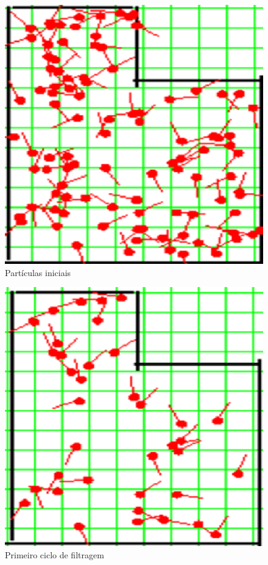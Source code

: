 \begin{figure}[H]
  \centering
  \includegraphics[scale=0.6]{figuras/cen1_ex4/1.eps}
  \caption[Partículas Iniciais]{Partículas iniciais}
  \label{img:cen1_ex4_1}
\end{figure}

\begin{figure}[H]
  \centering
  \includegraphics[scale=0.6]{figuras/cen1_ex4/2.eps}
  \caption[Primeiro Ciclo de Filtragem]{Primeiro ciclo de filtragem}
  \label{img:cen1_ex4_2}
\end{figure}

